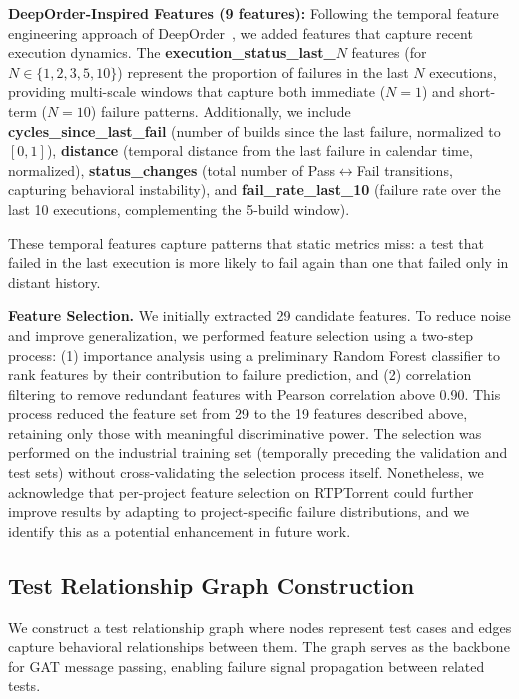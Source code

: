 \documentclass[10pt,journal,compsoc]{IEEEtran}
\begin{document}
\textbf{DeepOrder-Inspired Features (9 features):} Following the temporal
feature engineering approach of DeepOrder~\cite{chen2023deeporder}, we added
features that capture recent execution dynamics. The
\textbf{execution\_status\_last\_$N$} features (for $N \in \{1, 2, 3, 5, 10\}$)
represent the proportion of failures in the last $N$ executions, providing
multi-scale windows that capture both immediate ($N{=}1$) and short-term
($N{=}10$) failure patterns. Additionally, we include
\textbf{cycles\_since\_last\_fail} (number of builds since the last failure,
normalized to $[0, 1]$), \textbf{distance} (temporal distance from the last
failure in calendar time, normalized), \textbf{status\_changes} (total number
of Pass$\leftrightarrow$Fail transitions, capturing behavioral instability),
and \textbf{fail\_rate\_last\_10} (failure rate over the last 10 executions,
complementing the 5-build window).

These temporal features capture patterns that static metrics miss: a test that
failed in the last execution is more likely to fail again than one that failed
only in distant history.

\textbf{Feature Selection.} We initially extracted 29 candidate features.
To reduce noise and improve generalization, we performed feature selection using
a two-step process: (1) importance analysis using a preliminary Random Forest
classifier to rank features by their contribution to failure prediction, and
(2) correlation filtering to remove redundant features with Pearson correlation
above 0.90. This process reduced the feature set from 29 to the 19 features
described above, retaining only those with meaningful discriminative power.
The selection was performed on the industrial training set (temporally
preceding the validation and test sets) without cross-validating the selection
process itself. Nonetheless, we acknowledge
that per-project feature selection on RTPTorrent could further improve
results by adapting to project-specific failure distributions, and we
identify this as a potential enhancement in future work.

\subsection{Test Relationship Graph Construction}
\label{sec:graph}

We construct a test relationship graph where nodes represent test cases and
edges capture behavioral relationships between them. The graph serves as the
backbone for GAT message passing, enabling failure signal propagation
between related tests.
\end{document}
